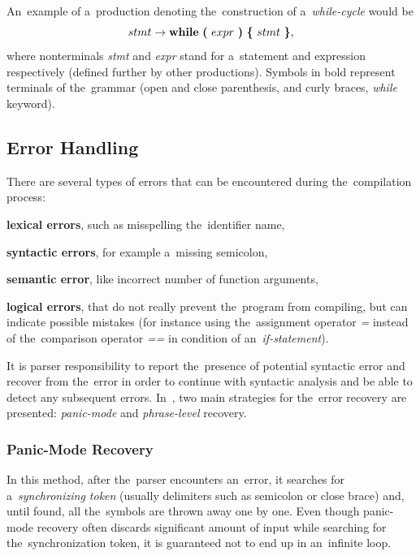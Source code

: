 \documentclass[
  digital, %
  table,   %
  lof,     %
  lot,     %
  oneside,
]{fithesis3}
\begin{document}
An~example of a~production denoting the~construction of a~\textit{while-cycle} would be
\begin{equation}
  stmt 
  \rightarrow 
  \textbf{while}\ 
  \textbf{(}\ expr\ \textbf{)}\ 
  \textbf{\{}\ stmt\ \textbf{\}} 
  \textnormal{,}
\end{equation}
\noindent
where nonterminals \textit{stmt} and \textit{expr} stand for a~statement and expression respectively (defined further by other productions). Symbols in bold represent terminals of the~grammar (open and close parenthesis, and curly braces, \textit{while} keyword).

\subsection{Error Handling}
There are several types of errors that can be encountered during the~compilation process:
\begin{compactitem}
  \item\textbf{lexical errors}, such as misspelling the~identifier name,
  \item\textbf{syntactic errors}, for example a~missing semicolon,
  \item\textbf{semantic error}, like incorrect number of function arguments,
  \item\textbf{logical errors}, that do not really prevent the~program from compiling, but can indicate possible mistakes (for instance using the~assignment operator \textit{=} instead of the~comparison operator \textit{==} in condition of an~\textit{if-statement}).
\end{compactitem} 

It is parser responsibility to report the~presence of potential syntactic error and recover from the~error in order to continue with syntactic analysis and be able to detect any subsequent errors. In~\cite{dragon-book}, two main strategies for the~error recovery are presented: \textit{panic-mode} and \textit{phrase-level} recovery.

\subsubsection{\textbf{Panic-Mode Recovery}}
In this method, after the~parser encounters an~error, it searches for a~\textit{synchronizing token} (usually delimiters such as semicolon or close brace) and, until found, all the~symbols are thrown away one by one. Even though panic-mode recovery often discards significant amount of input while searching for the~synchronization token, it is guaranteed not to end up in an~infinite loop.
\end{document}
